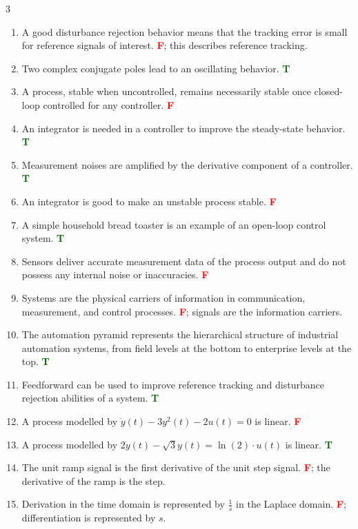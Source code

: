\documentclass[9pt, landscape, a4paper]{article}
\begin{document}
\begin{multicols*}{3}
\begin{enumerate}[leftmargin=*, itemsep=2pt, parsep=1pt]
    \item A good disturbance rejection behavior means that the tracking error is small for reference signals of interest. \textbf{\textcolor{red}{F}}; this describes reference tracking.
    \item Two complex conjugate poles lead to an oscillating behavior. \textbf{\textcolor{darkgreen}{T}}
    \item A process, stable when uncontrolled, remains necessarily stable once closed-loop controlled for any controller. \textbf{\textcolor{red}{F}}
    \item An integrator is needed in a controller to improve the steady-state behavior. \textbf{\textcolor{darkgreen}{T}}
    \item Measurement noises are amplified by the derivative component of a controller. \textbf{\textcolor{darkgreen}{T}}
    \item An integrator is good to make an unstable process stable. \textbf{\textcolor{red}{F}}
    \item A simple household bread toaster is an example of an open-loop control system. \textbf{\textcolor{darkgreen}{T}}
    \item Sensors deliver accurate measurement data of the process output and do not possess any internal noise or inaccuracies. \textbf{\textcolor{red}{F}}
    \item Systems are the physical carriers of information in communication, measurement, and control processes. \textbf{\textcolor{red}{F}}; signals are the information carriers.
    \item The automation pyramid represents the hierarchical structure of industrial automation systems, from field levels at the bottom to enterprise levels at the top. \textbf{\textcolor{darkgreen}{T}}
    \item Feedforward can be used to improve reference tracking and disturbance rejection abilities of a system. \textbf{\textcolor{darkgreen}{T}}
    \item A process modelled by $\dot{y}(t)-3y^2(t)-2u(t)=0$ is linear. \textbf{\textcolor{red}{F}}
    \item A process modelled by $2\dot{y}(t)-\sqrt{3}y(t)=\ln(2)\cdot u(t)$ is linear. \textbf{\textcolor{darkgreen}{T}}
    \item The unit ramp signal is the first derivative of the unit step signal. \textbf{\textcolor{red}{F}}; the derivative of the ramp is the step.
    \item Derivation in the time domain is represented by $\frac{1}{s}$ in the Laplace domain. \textbf{\textcolor{red}{F}}; differentiation is represented by $s$.

\end{enumerate}
\end{multicols*}
\end{document}
